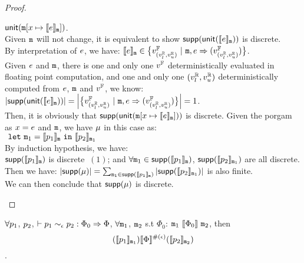 \documentclass[a4paper,11pt]{article}
\begin{document}
\begin{proof}
\begin{itemize}
	$\mathsf{unit}(\mathtt{m}[x \mapsto \llbracket e \rrbracket_{\mathtt{m}}])$.
	\\
	Given $\mathtt{m}$ will not change, it is equivalent to show 
	$\mathsf{supp}(\mathsf{unit}(\llbracket e \rrbracket_{\mathtt{m}}))$ is discrete.
	\\
	By interpretation of $e$, we have: 
	$\llbracket e \rrbracket_{\mathtt{m}} \in  
	\big\{v^{\mathbb{F}}_{(v^{\mathbb{R}}_{l}, v^{\mathbb{R}}_{u})} ~|~
	\mathtt{m},  
	e \Rightarrow (v^{\mathbb{F}}_{(v^{\mathbb{R}}_{l}, v^{\mathbb{R}}_{u})})\big\}$.
	\\
	Given $e$ and $\mathtt{m}$, 
	there is one and only one $v^{\mathbb{F}}$ deterministically evaluated in floating point computation, and one and only one $(v^{\mathbb{R}}_{l}, v^{\mathbb{R}}_{u})$ deterministically computed from $e$, $\mathtt{m}$ and $v^{\mathbb{F}}$, we know:
	\\
	$\left \vert \mathsf{supp}(\mathsf{unit}(\llbracket e \rrbracket_{\mathtt{m}})) \right \vert  
	= 
	\left \vert \big\{v^{\mathbb{F}}_{(v^{\mathbb{R}}_{l}, v^{\mathbb{R}}_{u})} ~|~
		\mathtt{m},  
		e \Rightarrow (v^{\mathbb{F}}_{(v^{\mathbb{R}}_{l}, v^{\mathbb{R}}_{u})})\big\} \right \vert  = 1$.
	\\
		Then, it is obviously that $\mathsf{supp}(\mathsf{unit}(\mathtt{m}[x \mapsto \llbracket e \rrbracket_{\mathtt{m}}]))$ is discrete.
	Given the porgam as $x = e$ and $\mathtt{m}$, 
	we have $\mu$ in this case as:
	\\
	$~\mathtt{let}~  \mathtt{m}_1 = 
	 	\llbracket p_1 \rrbracket_{\mathtt{m}} ~\mathtt{in}~
	 	\llbracket p_2 \rrbracket_{\mathtt{m}_1}$ 
	 \\
	 By induction hypothesis, we have:
	 \\
	 $\mathsf{supp}(\llbracket p_1 \rrbracket_{\mathtt{m}})$ is discrete $~(1)$; and 
	 $\forall \mathtt{m}_1 \in \mathsf{supp}(\llbracket p_1 \rrbracket_{\mathtt{m}})$, $\mathsf{supp}(\llbracket p_2 \rrbracket_{\mathtt{m}_1})$ are all discrete.
	 \\
	 Then we have: $\left \vert \mathsf{supp}(\mu) \right \vert = \sum_{\mathtt{m}_1 \in \mathsf{supp}(\llbracket p_1 \rrbracket_{\mathtt{m}})} \left \vert \mathsf{supp}(\llbracket p_2 \rrbracket_{\mathtt{m}_1}) \right \vert$ is also finite.
	 \\
	 We can then conclude that $\mathsf{supp}(\mu)$ is discrete.
\end{itemize}
\end{proof}
%
%
%
\clearpage
\begin{thm}[Soundness]
 $\forall p_1$, $p_2$,  $ \vdash p_1	
\sim_{\epsilon} 
p_2 :
\Phi_0 \Rightarrow \Phi $,    $\forall \mathtt{m}_1$, $\mathtt{m}_2$ 
s.t $\Phi_0$: 
$\mathtt{m}_1 ~ \llbracket \Phi_0 \rrbracket ~ \mathtt{m}_2$,
then
$$ 
(\llbracket p_1 \rrbracket_{\mathtt{m}_1})  
\llbracket \Phi \rrbracket^{\#(\epsilon)} 
(\llbracket p_2 \rrbracket_{\mathtt{m}_2}) 
$$.
\end{thm}
%
%
%
\end{document}
